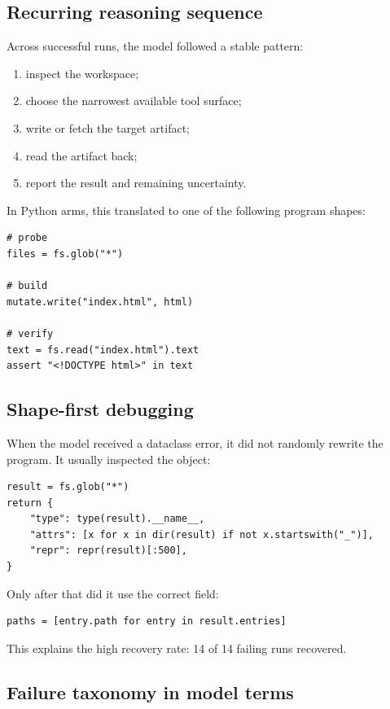 \documentclass[11pt]{article}
\begin{document}
\subsection{Recurring reasoning sequence}

Across successful runs, the model followed a stable pattern:

\begin{enumerate}[leftmargin=1.5em]
\item inspect the workspace;
\item choose the narrowest available tool surface;
\item write or fetch the target artifact;
\item read the artifact back;
\item report the result and remaining uncertainty.
\end{enumerate}

In Python arms, this translated to one of the following program shapes:

\begin{lstlisting}[style=python]
# probe
files = fs.glob("*")

# build
mutate.write("index.html", html)

# verify
text = fs.read("index.html").text
assert "<!DOCTYPE html>" in text
\end{lstlisting}

\subsection{Shape-first debugging}

When the model received a dataclass error, it did not randomly rewrite the
program.  It usually inspected the object:

\begin{lstlisting}[style=python]
result = fs.glob("*")
return {
    "type": type(result).__name__,
    "attrs": [x for x in dir(result) if not x.startswith("_")],
    "repr": repr(result)[:500],
}
\end{lstlisting}

Only after that did it use the correct field:

\begin{lstlisting}[style=python]
paths = [entry.path for entry in result.entries]
\end{lstlisting}

This explains the high recovery rate: 14 of 14 failing runs recovered.

\subsection{Failure taxonomy in model terms}
\end{document}
